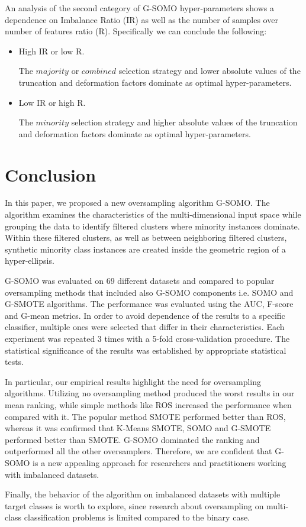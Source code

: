 \documentclass[parskip=full]{scrartcl}
\begin{document}
An analysis of the second category of G-SOMO hyper-parameters shows a dependence on Imbalance Ratio (IR) as well as the number of samples over number of features ratio (R). Specifically we can conclude the following:

\begin{itemize}

	\renewcommand\labelitemi{--}

	\item High IR or low R.
	
	The $ majority $ or $ combined $ selection strategy and lower absolute values of the truncation and deformation factors dominate as optimal hyper-parameters.

	\item Low IR or high R.
	
	The $ minority $ selection strategy and higher absolute values of the truncation and deformation factors dominate as optimal hyper-parameters.

\end{itemize}

\section{Conclusion}

In this paper, we proposed a new oversampling algorithm G-SOMO. The algorithm examines the characteristics of the multi-dimensional input space while grouping the data to identify filtered clusters where minority instances dominate. Within these filtered clusters, as well as between neighboring filtered clusters, synthetic minority class instances are created inside the geometric region of a hyper-ellipsis.

G-SOMO was evaluated on 69 different datasets and compared to popular oversampling methods that included also G-SOMO components i.e. SOMO and G-SMOTE algorithms. The performance was evaluated using the AUC, F-score and G-mean metrics. In order to avoid dependence of the results to a specific classifier, multiple ones were selected that differ in their characteristics. Each experiment was repeated 3 times with a 5-fold cross-validation procedure. The statistical significance of the results was established by appropriate statistical tests.

In particular, our empirical results highlight the need for oversampling algorithms. Utilizing no oversampling method produced the worst results in our mean ranking, while simple methods like ROS increased the performance when compared with it. The popular method SMOTE performed better than ROS, whereas it was confirmed that K-Means SMOTE, SOMO and G-SMOTE performed better than SMOTE. G-SOMO dominated the ranking and outperformed all the other oversamplers. Therefore, we are confident that G-SOMO is a new appealing approach for researchers and practitioners working with imbalanced datasets.

Finally, the behavior of the algorithm on imbalanced datasets with multiple target classes is worth to explore, since research about oversampling on multi-class classification problems is limited compared to the binary case.



\end{document}
